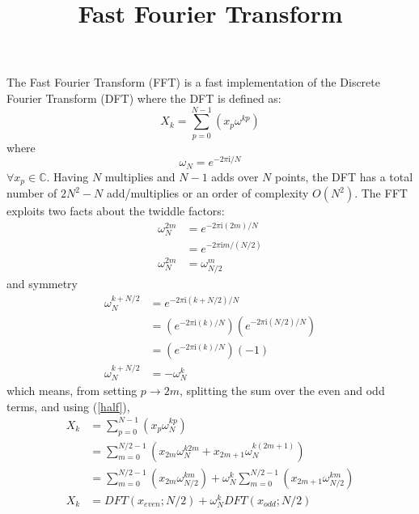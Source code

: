\documentclass{article}
\begin{document}
%
\title{Fast Fourier Transform}
%
\maketitle
%
The Fast Fourier Transform (FFT) is a fast implementation of the Discrete Fourier Transform (DFT) where the DFT is defined as:
%
\begin {equation} \label {eq:dft}
X_k = \sum_{p = 0}^{N-1} (x_p \omega^{k p})
\end {equation}
%
where
%
\begin {equation} \label {eq:twiddle}
\omega_N = e^{-2 \pi \mathrm {i} / N}
\end {equation}
%
$\forall x_p \in \mathbb {C}$. Having $N$ multiplies and $N-1$ adds over $N$ points, the DFT has a total number of $2 N^2 - N$ add/multiplies or an order of complexity $O(N^2)$. The FFT exploits two facts about the twiddle factors:
%
\begin {equation} \label {half}
\begin {aligned}
\omega_N^{2m} &= e^{-2 \pi \mathrm {i} (2m) / N}    \\
              &= e^{-2 \pi \mathrm {i} m / (N / 2)} \\
\omega_N^{2m} &= \omega_{N/2}^m
\end {aligned}
\end {equation}
%
and symmetry
%
\begin {equation} \label {symmetry}
\begin {aligned}
\omega_N^{k + N/2} &= e^{-2 \pi \mathrm {i} (k + N/2) / N} \\
             &= \left (e^{-2 \pi \mathrm {i} (k) / N} \right) \left (e^{-2 \pi \mathrm {i} (N/2) / N} \right) \\
             &= \left (e^{-2 \pi \mathrm {i} (k) / N} \right) \left (-1 \right) \\
\omega_N^{k + N/2} &= -\omega_{N}^{k}
\end {aligned}
\end {equation}
%
which means, from setting $p \rightarrow 2m$, splitting the sum over the even and odd terms, and using (\ref{half}),
%
\begin {equation} \label {eq:xk}
\begin {aligned}
X_k &= \sum_{p = 0}^{N-1} (x_p \omega_N^{k p}) \\
    &= \sum_{m = 0}^{N/2-1} (x_{2m} \omega_N^{k 2 m} + x_{2m+1} \omega_N^{k (2 m + 1)}) \\
    &= \sum_{m = 0}^{N/2-1} (x_{2m} \omega_{N/2}^{k m}) + \omega_N^{k} \sum_{m = 0}^{N/2-1} (x_{2m+1} \omega_{N/2}^{km}) \\
X_k &= DFT(x_{even}; N/2) + \omega_N^{k} DFT(x_{odd}; N/2)
\end {aligned}
\end {equation}
\end{document}
